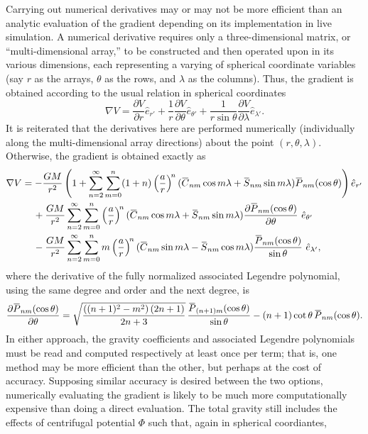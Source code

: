 \documentclass[11pt,dvipsnames]{thesis}
\newcommand{\overbar}[1]{\mkern 1.5mu\overline{\mkern-1.5mu#1\mkern-1.5mu}\mkern 1.5mu}
\begin{document}
Carrying out numerical derivatives may or may not be more efficient than an analytic evaluation of the gradient depending on its implementation in live simulation. A numerical derivative requires only a three-dimensional matrix, or ``multi-dimensional array,'' to be constructed and then operated upon in its various dimensions, each representing a varying of spherical coordinate variables (say $r$ as the arrays, $\theta$ as the rows, and $\lambda$ as the columns). Thus, the gradient is obtained according to the usual relation in spherical coordinates
\begin{equation}
\nabla V = \frac{\partial V}{\partial r} \hat{e}_{r'} + \frac{1}{r} \frac{\partial V}{\partial \theta} \hat{e}_{\theta'} + \frac{1}{r \sin\theta} \frac{\partial V}{\partial \lambda} \hat{e}_{\lambda'}.
\end{equation}
It is reiterated that the derivatives here are performed numerically (individually along the multi-dimensional array directions) about the point $(r, \theta, \lambda)$.
Otherwise, the gradient is obtained exactly as
\begin{align}
\nabla V &= -\frac{GM}{r^2} \left(1 + \sum_{n = 2}^\infty \sum_{m = 0}^n (1 + n) \left(\frac{a}{r}\right)^{\!n}(\overbar{C}_{nm} \cos m\lambda + \overbar{S}_{nm} \sin m\lambda) \overbar{P}_{nm}(\cos\theta)\right) \hat{e}_{r'} \nonumber\\
&\quad\, + \frac{GM}{r^2} \sum_{n = 2}^\infty \sum_{m = 0}^n \left(\frac{a}{r}\right)^{\!n}(\overbar{C}_{nm} \cos m\lambda + \overbar{S}_{nm} \sin m\lambda) \frac{\partial \overbar{P}_{nm}(\cos\theta)}{\partial \theta} \ \hat{e}_{\theta'} \nonumber\\
&\quad\, - \frac{GM}{r^2} \sum_{n = 2}^\infty \sum_{m = 0}^n m \left(\frac{a}{r}\right)^{\!n}(\overbar{C}_{nm} \sin m\lambda - \overbar{S}_{nm} \cos m\lambda) \frac{\overbar{P}_{nm}(\cos\theta)}{\sin\theta} \ \hat{e}_{\lambda'},
\end{align}
where the derivative of the fully normalized associated Legendre polynomial, using the same degree and order and the next degree, is
\begin{equation}
\frac{\partial \overbar{P}_{nm}(\cos\theta)}{\partial\theta} = \sqrt{\frac{\left((n+1)^2 - m^2\right)(2n+1)}{2n+3}} \, \frac{\overbar{P}_{(n+1)m}(\cos\theta)}{\sin\theta} - (n+1) \cot\theta\,\overbar{P}_{nm}(\cos\theta).
\end{equation}
In either approach, the gravity coefficients and associated Legendre polynomials must be read and computed respectively at least once per term; that is, one method may be more efficient than the other, but perhaps at the cost of accuracy. Supposing similar accuracy is desired between the two options, numerically evaluating the gradient is likely to be much more computationally expensive than doing a direct evaluation. The total gravity still includes the effects of centrifugal potential $\Phi$ such that, again in spherical coordiantes,
\end{document}
